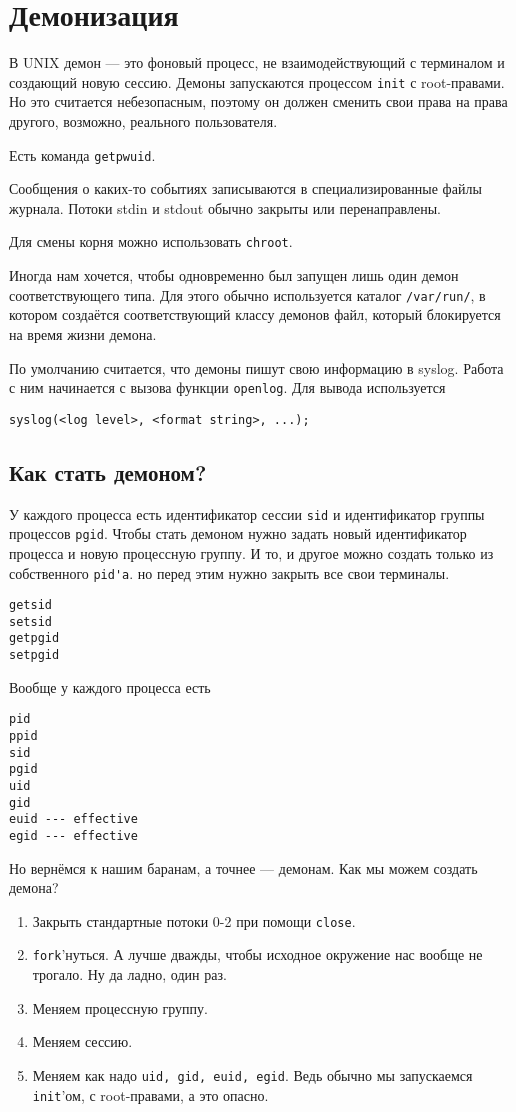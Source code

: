 \section{Демонизация}



В UNIX демон --- это фоновый процесс, не взаимодействующий с терминалом и создающий новую сессию. Демоны запускаются процессом \verb!init! с root-правами. Но это считается небезопасным, поэтому он должен сменить свои права на права другого, возможно, реального пользователя.

Есть команда \verb!getpwuid!.

Сообщения о каких-то событиях записываются в специализированные файлы журнала. Потоки stdin и stdout обычно закрыты или перенаправлены.

Для смены корня можно использовать \verb!chroot!. 

Иногда нам хочется, чтобы одновременно был запущен лишь один демон соответствующего типа. Для этого обычно используется каталог \verb!/var/run/!, в котором создаётся соответствующий классу демонов файл, который блокируется на время жизни демона.

По умолчанию считается, что демоны пишут свою информацию в syslog. Работа с ним начинается с вызова функции \verb!openlog!. Для вывода используется
\begin{verbatim}
syslog(<log level>, <format string>, ...);
\end{verbatim}

\subsection{Как стать демоном?}

У каждого процесса есть идентификатор сессии \verb!sid! и идентификатор группы процессов \verb!pgid!. Чтобы стать демоном нужно задать новый идентификатор процесса и новую процессную группу. И то, и другое можно создать только из собственного \verb!pid'a!. но перед этим нужно закрыть все свои терминалы.

\begin{verbatim}
getsid
setsid
getpgid
setpgid
\end{verbatim}

Вообще у каждого процесса есть
\begin{verbatim}
pid
ppid
sid
pgid
uid
gid
euid --- effective
egid --- effective
\end{verbatim}

Но вернёмся к нашим баранам, а точнее --- демонам. Как мы можем создать демона?

\begin{enumerate}
\item Закрыть стандартные потоки 0-2 при помощи \verb!close!.
\item \verb!fork!'нуться. А лучше дважды, чтобы исходное окружение нас вообще не трогало. Ну да ладно, один раз.
\item Меняем процессную группу.
\item Меняем сессию.
\item Меняем как надо \verb!uid, gid, euid, egid!. Ведь обычно мы запускаемся \verb!init!'ом, с root-правами, а это опасно.
\end{enumerate}
